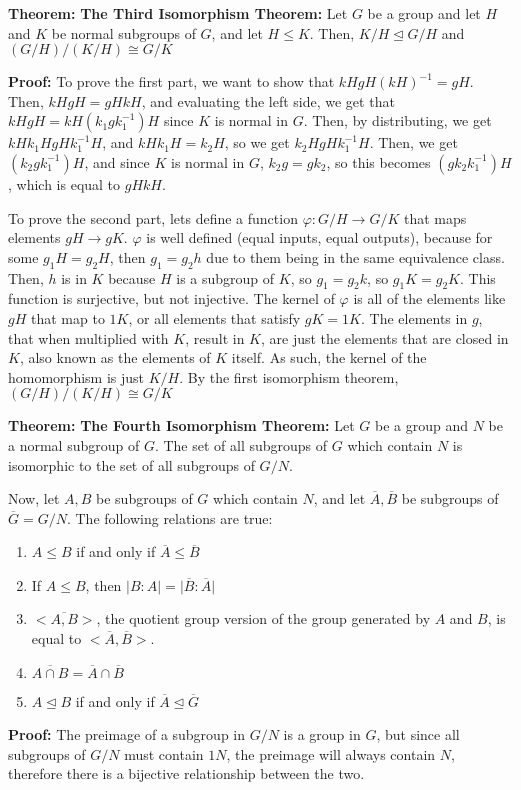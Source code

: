 \documentclass{article}
\begin{document}
\textbf{Theorem:} \textbf{The Third Isomorphism Theorem:} Let $G$ be a group and let $H$ and $K$ be normal subgroups of $G$, and let $H \leq K$. Then, $K/H \trianglelefteq G/H$ and $(G/H)/(K/H) \cong G/K$

\textbf{Proof:} To prove the first part, we want to show that $kH gH (kH) ^{-1} = gH$. Then, $kH gH = gH kH$, and evaluating the left side, we get that $kH gH = kH (k_1gk_1 ^{-1} )H$ since $K$ is normal in $G$. Then, by distributing, we get $kH k_1H gH k_1 ^{-1} H$, and $kH k_1 H = k_2 H$, so we get $k_2 H gH k_1 ^{-1} H$. Then, we get $(k_2 g k_1 ^{-1} )H$, and since $K$ is normal in $G$, $k_2 g = g k_2$, so this becomes $(g k_2 k_1 ^{-1}) H$, which is equal to $gH kH$. 

To prove the second part, lets define a function $\varphi : G/H \rightarrow G/K$ that maps elements $gH \rightarrow gK$. $\varphi$ is well defined (equal inputs, equal outputs), because for some $g_1H = g_2H$, then $g_1 = g_2 h$ due to them being in the same equivalence class. Then, $h$ is in $K$ because $H$ is a subgroup of $K$, so $g_1 = g_2 k$, so $g_1 K = g_2 K$. This function is surjective, but not injective. The kernel of $\varphi$ is all of the elements like $gH$ that map to $1K$, or all elements that satisfy $gK = 1K$. The elements in $g$, that when multiplied with $K$, result in $K$, are just the elements that are closed in $K$, also known as the elements of $K$ itself. As such, the kernel of the homomorphism is just $K/H$. By the first isomorphism theorem, $(G/H)/(K/H) \cong G/K$

\textbf{Theorem:} \textbf{The Fourth Isomorphism Theorem:} Let $G$ be a group and $N$ be a normal subgroup of $G$. The set of all subgroups of $G$ which contain $N$ is isomorphic to the set of all subgroups of $G/N$. 

Now, let $A,B$ be subgroups of $G$ which contain $N$, and let $\overline{A}, \overline{B}$ be subgroups of $\overline{G} = G/N$. The following relations are true:
\begin{enumerate}
    \item $A \leq B$ if and only if $\overline{A} \leq \overline{B}$
    \item If $A \leq B$, then $\vert B:A \vert = \vert \overline{B} : \overline{A} \vert$
    \item $\overline{<A,B>}$, the quotient group version of the group generated by $A$ and $B$, is equal to $<\overline{A},\overline{B}>$.
    \item $\overline{A \cap B} = \overline{A} \cap \overline{B}$
    \item $A \trianglelefteq B$ if and only if $\overline{A} \trianglelefteq \overline{G}$
\end{enumerate}

\textbf{Proof:} The preimage of a subgroup in $G/N$ is a group in $G$, but since all subgroups of $G/N$ must contain $1N$, the preimage will always contain $N$, therefore there is a bijective relationship between the two. 
\end{document}
